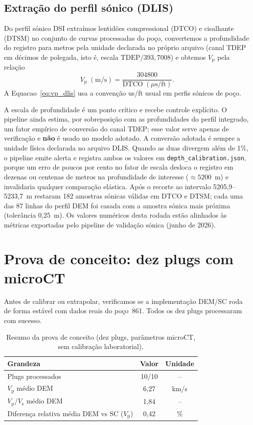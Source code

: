 \documentclass[11pt,a4paper]{article}
\numberwithin{equation}{section}
\newcommand{\Vp}{\ensuremath{V_{\mathrm{p}}}}
\newcommand{\VpVs}{\ensuremath{V_{\mathrm{p}}/V_{\mathrm{s}}}}
\begin{document}
\subsection{Extração do perfil sónico (DLIS)}

Do perfil sónico DSI extraímos lentidões compressional (DTCO) e
cisalhante (DTSM) no conjunto de curvas processadas do poço, convertemos a
profundidade do registro para metros pela unidade declarada no próprio
arquivo (canal TDEP em décimos de polegada, isto é, escala
$\mathrm{TDEP}/393{,}7008$) e obtemos \Vp{} pela relação
\begin{equation}
  \label{eq:vp_dlis}
  \Vp\;(\mathrm{m/s}) = \frac{304800}{\mathrm{DTCO}\;(\mu\mathrm{s/ft})}.
\end{equation}
A Equacao~\eqref{eq:vp_dlis} usa a convenção us/ft usual em perfis
sónicos de poço.

A escala de profundidade é um ponto crítico e recebe controle explícito.
O pipeline ainda estima, por sobreposição com as profundidades do perfil
integrado, um fator empírico de conversão do canal TDEP; esse valor serve
apenas de verificação e \textbf{não} é usado no modelo adotado.
A conversão adotada é sempre a unidade física declarada no arquivo DLIS.
Quando as duas divergem além de 1\%, o pipeline emite alerta e registra
ambos os valores em \texttt{depth\_calibration.json}, porque um erro de
poucos por cento no fator de escala desloca o registro em dezenas ou
centenas de metros na profundidade de interesse ($\approx 5200$~m) e
invalidaria qualquer comparação elástica.
Após o recorte ao intervalo 5205,9--5233,7~m restaram 182 amostras sónicas
válidas em DTCO e DTSM; cada uma das 87 linhas do perfil DEM foi casada com
a amostra sónica mais próxima (tolerância 0,25~m).
Os valores numéricos desta rodada estão alinhados às métricas
exportadas pelo pipeline de validação sónica (junho de 2026).

\section{Prova de conceito: dez plugs com microCT}
\label{sec:poc}

Antes de calibrar ou extrapolar, verificamos se a implementação DEM/SC
roda de forma estável com dados reais do poço~861.
Todos os dez plugs processaram com sucesso.

\begin{table}[H]
  \centering
  \caption{Resumo da prova de conceito (dez plugs, parâmetros microCT,
           sem calibração laboratorial).}
  \label{tab:poc}
  \begin{tabular}{lcc}
    \toprule
    Grandeza & Valor & Unidade \\
    \midrule
    Plugs processados & 10/10 & -- \\
    \Vp{} médio DEM & 6,27 & km/s \\
    \VpVs{} médio DEM & 1,84 & -- \\
    Diferença relativa média DEM vs SC (\Vp) & 0,42 & \% \\
    \bottomrule
  \end{tabular}
\end{table}
\end{document}
